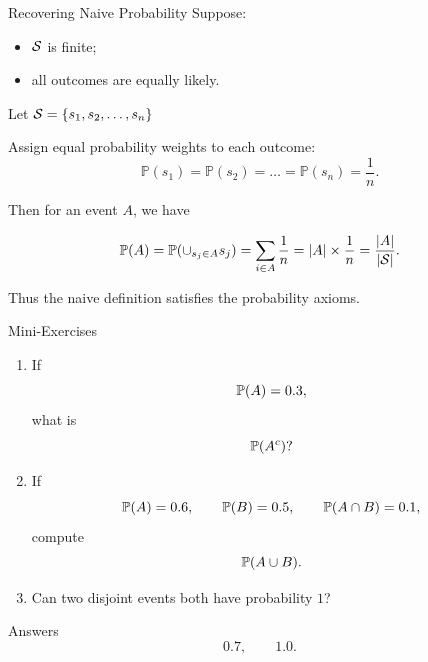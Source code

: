 \begin{frame}{Recovering Naive Probability}
Suppose:
\begin{itemize}
    \item $\mathcal{S}$ is finite;
    \item all outcomes are equally likely.
\end{itemize}

Let $\mathcal{S} = \{s_1, s_2, \dots ,s_n \} $

Assign equal probability weights to each outcome:
\[
\mathbb{P}(s_1) = \mathbb{P}(s_2) = \dots = \mathbb{P}(s_n) = \frac1n.
\]

Then for an event $A$, we have

\[
\mathbb{P}(A) = \mathbb{P} (\cup_{s_j\in A} s_j) = \sum_{i \in A}\frac{1}{n} =
|A| \times \frac{1}{n}
=
\frac{|A|}{|\mathcal{S}|}.
\]

\vspace{0.25cm}

Thus the naive definition satisfies the probability axioms.
\end{frame}

\begin{frame}{Mini-Exercises}
\begin{enumerate}
    \item If
    \[
    \mathbb{P}(A)=0.3,
    \]
    what is
    \[
    \mathbb{P}(A^c)?
    \]

    \item If
    \[
    \mathbb{P}(A)=0.6,
    \qquad
    \mathbb{P}(B)=0.5,
    \qquad
    \mathbb{P}(A\cap B)=0.1,
    \]
    compute
    \[
    \mathbb{P}(A\cup B).
    \]

    \item Can two disjoint events both have probability $1$?

\end{enumerate}

\begin{livebox}{Answers}
\[
0.7,
\qquad
1.0.
\]
\end{livebox}
\end{frame}

